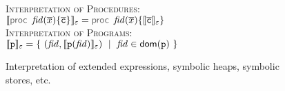 \begin{figure}[t!]
{\textsc{Interpretation of Procedures}: $\semexpr{\procedure{\fid}{\jvec{\jvar}}{\jvec{\ivlcmd}}}{\senv} = \procedure{\fid}{\jvec{\jvar}}{\semexpr{\jvec{\ivlcmd}}{\senv}}$ \\

\textsc{Interpretation of Programs}:
$\semexpr{\prog}{\senv} = \{\ (\fid, \semexpr{\prog(\fid)}{\senv}) \ \mid \ \fid \in \domain(\prog) \ \}$

}

\caption{Interpretation of extended expressions, symbolic heaps, symbolic stores, etc.\label{fig:symbolic:interp:full}}
\vspace{-0.5cm}
\end{figure}
%

